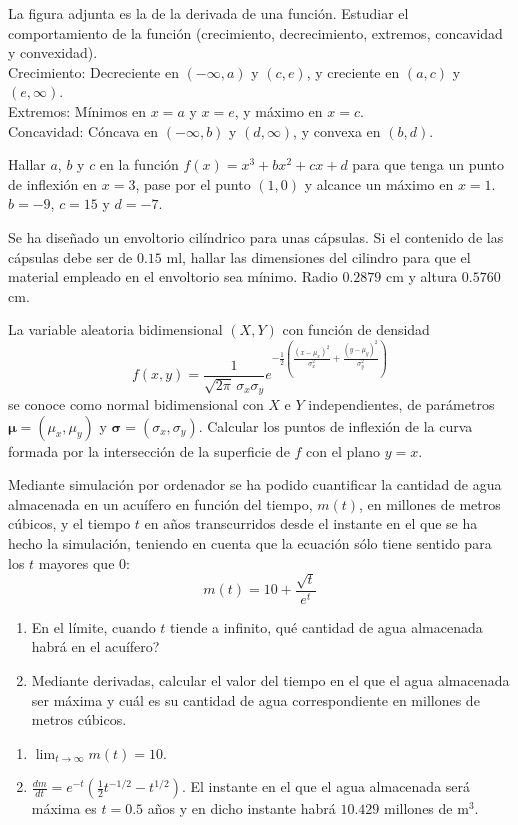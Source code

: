 
{La figura adjunta es la de la derivada de una función.  Estudiar el comportamiento de la función (crecimiento, decrecimiento, extremos, concavidad y convexidad).
\[

\]
}
{Crecimiento: Decreciente en $(-\infty,a)$ y $(c,e)$, y creciente en $(a,c)$ y $(e,\infty)$.\\
Extremos: Mínimos en $x=a$ y $x=e$, y máximo en $x=c$.\\
Concavidad: Cóncava en $(-\infty,b)$ y $(d,\infty)$, y convexa en $(b,d)$.
}
{
}

{Hallar $a$, $b$ y $c$ en la función  $f(x)=x^3+bx^2+cx+d$ para que tenga un punto de inflexión en $x=3$, pase por el punto $(1,0)$ y alcance un máximo en $x=1$.
}
{$b=-9$, $c=15$ y $d=-7$.
}
{
}

{Se ha diseñado un envoltorio cilíndrico para unas cápsulas. Si el contenido de las cápsulas debe ser de $0.15$ ml, hallar las dimensiones del cilindro para que el material empleado en el envoltorio sea mínimo.
}
{Radio $0.2879$ cm y altura $0.5760$ cm.
}
{
}


{La variable aleatoria bidimensional $(X,Y)$ con función de densidad
\[
f(x,y) = \frac{1}{\sqrt{2\pi}\, \sigma_x\sigma_y} e^{-\frac{1}{2}\left(\frac{(x-\mu_x)^2}{\sigma_x^2}+\frac{(y-\mu_y)^2}{\sigma_y^2}\right)}
\]
se conoce como normal bidimensional con $X$ e $Y$ independientes, de parámetros $\mathbf{\mu}=(\mu_x,\mu_y)$ y $\mathbf{\sigma}=(\sigma_x,\sigma_y)$.
Calcular los puntos de inflexión de la curva formada por la intersección de la superficie de $f$ con el plano $y=x$.
}


{Mediante simulación por ordenador se ha podido cuantificar la cantidad de agua almacenada en un acuífero en función del tiempo, $m(t)$, en millones de metros cúbicos, y el tiempo $t$ en años transcurridos desde el instante en el que se ha hecho la simulación, teniendo en cuenta que la ecuación sólo tiene sentido para los $t$ mayores que 0:
\[
m(t) = 10 + \frac{{\sqrt t }} {{e^t }}
\]
\begin{enumerate}
\item En el límite, cuando $t$ tiende a infinito, qué cantidad de agua almacenada habrá en el acuífero?
\item Mediante derivadas, calcular el valor del tiempo en el que el agua almacenada ser máxima y cuál es su cantidad de agua correspondiente en millones de metros cúbicos.
\end{enumerate}
}
{\begin{enumerate}
\item $\lim_{t\rightarrow \infty}m(t) = 10$.
\item $\frac{dm}{dt}=e^{-t}(\frac{1}{2}t^{-1/2}-t^{1/2})$. El instante en el que el agua almacenada será máxima es $t=0.5$ años y en dicho
instante habrá $10.429$ millones de m$^3$.
\end{enumerate}
}
{
}


